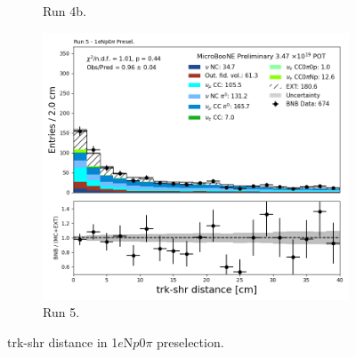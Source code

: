 \begin{figure}[H]
\begin{subfigure}[t]{0.32\linewidth}
        \caption{Run 4b.}
    \end{subfigure}%
    \hspace{0.2cm}%
    \begin{subfigure}[t]{0.32\linewidth}
        \includegraphics[width=\linewidth]{technote/Appendix_Preselection/Figures/1eNp0pi/Run5/tksh_distance_Run5_1eNp0pi_Presel.png}
        \caption{Run 5.}
    \end{subfigure}
    \caption{trk-shr distance in 1$e$N$p$0$\pi$ preselection.}
\end{figure}

